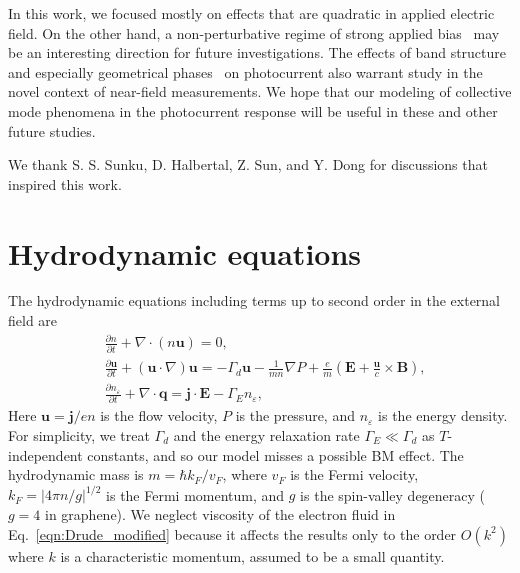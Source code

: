 \documentclass[aps, prb, reprint, superscriptaddress]{revtex4-2}
\renewcommand{\vec}{\mathbf}
\begin{document}
In this work, we focused mostly on effects that are quadratic in applied electric field. 
On the other hand, a non-perturbative regime of strong applied bias~\cite{Dong2021} may be an interesting direction for future investigations. 
The effects of band structure and especially geometrical phases~\cite{Holder2020,Zeng2021} on photocurrent also warrant study in the novel context of near-field measurements.  
We hope that our modeling of collective mode phenomena in the photocurrent response will be useful in these and other future studies. 

\acknowledgements
	
We thank S. S. Sunku, D. Halbertal, Z. Sun, and Y. Dong for discussions that inspired this work. 


%


\appendix
\section{Hydrodynamic equations}
\label{appendix:HD_equations}

The hydrodynamic equations including terms up to second order in the external field are
\begin{align}
	&\frac{\partial  n}{\partial t} + \nabla \cdot \left(n \vec{u}\right) = 0, 
	\label{eqn:chargecont_2}\\ 
	&\frac{\partial\vec{u}}{\partial t} + \left(\vec{u}\cdot\nabla\right)\vec{u} = -\Gamma_d{\vec{u}}  - \frac{1}{m n}\nabla{P} + \frac{e}{m}\left(\vec{E} + \frac{\vec{u}}{c}\times\vec{B}\right),
	\label{eqn:Drude_modified}\\
	&\frac{\partial n_\varepsilon}{\partial t} + \nabla\cdot \vec{q} 
	= \vec{j}\cdot\vec{E} - \Gamma_E n_\varepsilon,
	\label{eqn:energy_cons} 
\end{align}
Here $\vec{u} = \vec{j} / e n$ is the flow velocity, $P$ is the pressure, and $n_\varepsilon$ is the energy density.
For simplicity, we treat $\Gamma_d$ and the energy relaxation rate $\Gamma_E  \ll \Gamma_d$ as $T$-independent constants, and so our model misses a possible BM effect.
The hydrodynamic mass is $m = \hbar k_F / v_F$, where $v_F$ is the Fermi velocity, $k_F = |4 \pi n / g|^{1 / 2}$ is the Fermi momentum, and $g$ is the spin-valley degeneracy ($g = 4$ in graphene).
We neglect viscosity of the electron fluid in Eq.~\eqref{eqn:Drude_modified} because it affects the results only to the order $O(k^2)$ where $k$ is a characteristic momentum, assumed to be a small quantity.
\end{document}
